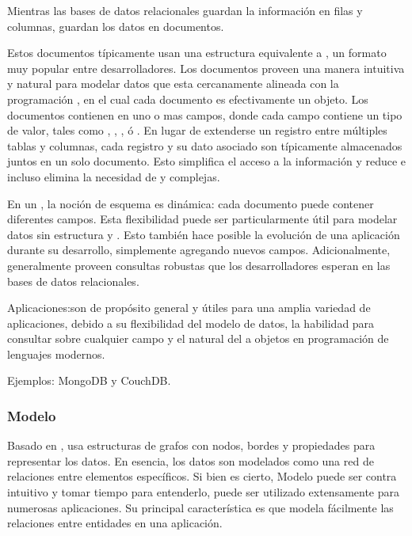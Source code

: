  Mientras las bases de datos relacionales guardan la información en filas y columnas, \documentDB \dataBases guardan los datos en documentos.  

Estos documentos típicamente usan una estructura equivalente a \json, un formato muy popular entre desarrolladores. Los documentos proveen una manera intuitiva y natural para modelar datos que esta cercanamente alineada con la programación \objectOriented, en el cual cada documento es efectivamente un objeto. Los documentos contienen en uno o mas campos, donde cada campo contiene un tipo de valor, tales como \stringPL, \datePL, \binaryPL, ó \arrayPL. En lugar de extenderse un registro entre múltiples tablas y columnas, cada registro y su dato asociado son típicamente almacenados juntos en un solo documento. Esto simplifica el acceso a la información y reduce e incluso elimina la necesidad de \joins y \transactionsDB complejas.

En un \documentDB \dataBase, la noción de esquema es dinámica: cada documento puede contener diferentes campos. Esta flexibilidad puede ser particularmente útil para modelar datos sin estructura y \polymorphic. Esto también hace posible la evolución de una aplicación durante su desarrollo, simplemente agregando nuevos campos. Adicionalmente, \documentDB \dataBases generalmente proveen consultas robustas que los desarrolladores esperan en las bases de datos relacionales.

Aplicaciones:\documentDB \dataBases son de propósito general y útiles para una amplia variedad de aplicaciones, debido a su flexibilidad del modelo de datos, la habilidad para consultar sobre cualquier campo y el \mapping natural del \documentDB \dataModel a objetos en programación de lenguajes modernos.

Ejemplos: MongoDB y CouchDB.

\subsubsection{Modelo \graphCustom}
\label{cap:justificacion_proyecto:base_datos:nosql:graph_model}

Basado en \graphTheory, usa estructuras de grafos con nodos, bordes y propiedades para representar los datos. En esencia, los datos son modelados como una red de relaciones entre elementos específicos. Si bien es cierto, Modelo \graphCustom puede ser contra intuitivo y tomar tiempo para entenderlo, puede ser utilizado extensamente para numerosas aplicaciones. Su principal característica es que modela fácilmente las relaciones entre entidades en una aplicación.

